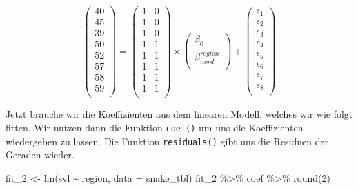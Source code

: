 \documentclass[
  letterpaper,
]{scrbook}
\newenvironment{Shaded}{\begin{snugshade}}{\end{snugshade}}
\newcommand{\AttributeTok}[1]{\textcolor[rgb]{0.40,0.45,0.13}{#1}}
\newcommand{\DecValTok}[1]{\textcolor[rgb]{0.68,0.00,0.00}{#1}}
\newcommand{\FunctionTok}[1]{\textcolor[rgb]{0.28,0.35,0.67}{#1}}
\newcommand{\NormalTok}[1]{\textcolor[rgb]{0.00,0.23,0.31}{#1}}
\newcommand{\OtherTok}[1]{\textcolor[rgb]{0.00,0.23,0.31}{#1}}
\newcommand{\SpecialCharTok}[1]{\textcolor[rgb]{0.37,0.37,0.37}{#1}}
\begin{document}
\[
 \begin{pmatrix}
  40 \\
  45 \\
  39 \\
  50 \\
  52 \\
  57 \\
  58 \\
  59 \\
 \end{pmatrix}
 =
  \begin{pmatrix}
  1 &  0  \\
  1 &  0 \\
  1 &  0\\
  1 &  1\\
  1 &  1 \\
  1 &  1 \\
  1 &  1 \\
  1 &  1 \\
 \end{pmatrix}
 \times
  \begin{pmatrix}
  \beta_0 \\
  \beta^{region}_{nord} \\
 \end{pmatrix} +
  \begin{pmatrix}
  \epsilon_1 \\
  \epsilon_2 \\
  \epsilon_3 \\
  \epsilon_4 \\
  \epsilon_5 \\
  \epsilon_6 \\
  \epsilon_7 \\
  \epsilon_8 \\
 \end{pmatrix}
\]

Jetzt brauche wir die Koeffizienten aus dem linearen Modell, welches wir
wie folgt fitten. Wir nutzen dann die Funktion \texttt{coef()} um uns
die Koeffizienten wiedergeben zu lassen. Die Funktion
\texttt{residuals()} gibt uns die Residuen der Geraden wieder.

\begin{Shaded}
\begin{Highlighting}[]
\NormalTok{fit\_2 }\OtherTok{\textless{}{-}} \FunctionTok{lm}\NormalTok{(svl }\SpecialCharTok{\textasciitilde{}}\NormalTok{ region, }\AttributeTok{data =}\NormalTok{ snake\_tbl) }
\NormalTok{fit\_2 }\SpecialCharTok{\%\textgreater{}\%}\NormalTok{ coef }\SpecialCharTok{\%\textgreater{}\%} \FunctionTok{round}\NormalTok{(}\DecValTok{2}\NormalTok{)}
\end{Highlighting}
\end{Shaded}
\end{document}
